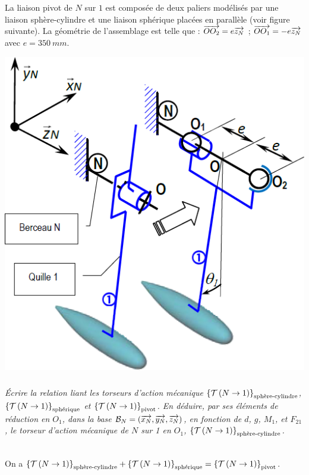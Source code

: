 \documentclass[10pt,fleqn]{article} %
\begin{document}
\begin{multicols}{2}
\begin{corrige}
\end{corrige}
\else
\fi

\ifprof
\else

La liaison pivot de $N$ sur $1$ est composée de deux paliers modélisés par une liaison sphère-cylindre et une liaison sphérique placées en parallèle (voir figure suivante). La
géométrie de l’assemblage est telle que :
$\overrightarrow{OO_2}= e\overrightarrow{z_N}$ ; $\overrightarrow{OO_1}= -e\overrightarrow{z_N}$ avec $e=\SI{350}{mm}$.




\begin{center}
\includegraphics[width=\linewidth]{images/fig_05}
\end{center}
\fi

\subparagraph{}\textit{Écrire la relation liant les torseurs d’action mécanique $\left\{\mathcal{T} \left(N\rightarrow 1 \right) \right\}_{\text{sphère-cylindre}}$, $\left\{\mathcal{T} \left(N\rightarrow 1 \right) \right\}_{\text{sphérique}}$ et $\left\{\mathcal{T} \left(N\rightarrow 1 \right) \right\}_{\text{pivot}}$.
En déduire, par ses éléments de réduction en $O_1$, dans la
base $\mathcal{B}_N=\left(\overrightarrow{x_N} , \overrightarrow{y_N} , \overrightarrow{z_N} \right)$, en fonction de $d$, $g$, $M_1$, et $F_{21}$, le torseur d’action mécanique de $N$ sur 1 en $O_1$, $\left\{\mathcal{T} \left(N\rightarrow 1 \right) \right\}_{\text{sphère-cylindre}}$.}
\ifprof
\begin{corrige} ~\\
On a $\left\{\mathcal{T} \left(N\rightarrow 1 \right) \right\}_{\text{sphère-cylindre}} + \left\{\mathcal{T} \left(N\rightarrow 1 \right) \right\}_{\text{sphérique}} = \left\{\mathcal{T} \left(N\rightarrow 1 \right) \right\}_{\text{pivot}}$. 


\end{corrige}
\end{multicols}
\end{document}
